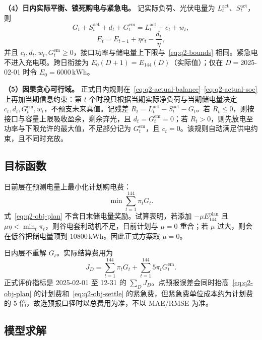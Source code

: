 \noindent\textbf{（4）日内实际平衡、锁死购电与紧急电。}
记实际负荷、光伏电量为 \(L_t^{\mathrm{act}}\)、\(S_t^{\mathrm{act}}\)，则
\begin{equation}
\label{eq:q2-actual-balance}
G_t+S_t^{\mathrm{act}}+d_t+G_t^{\mathrm{em}}
=L_t^{\mathrm{act}}+c_t+w_t,
\end{equation}
\begin{equation}
\label{eq:q2-actual-soc}
E_t=E_{t-1}+\eta c_t-\frac{d_t}{\eta},
\end{equation}
并且 \(c_t,d_t,w_t,G_t^{\mathrm{em}}\ge 0\)，接口功率与储电量上下限与~\eqref{eq:q2-bounds} 相同。紧急电不进入充电项。跨日衔接为 \(E_0(D+1)=E_{144}(D)\)（实际值）；仅在 \(D=\)2025-02-01 时令 \(E_0=6000\,\mathrm{kWh}\)。

\noindent\textbf{（5）因果贪心可行域。}
正式日内规则在~\eqref{eq:q2-actual-balance}--\eqref{eq:q2-actual-soc} 上再加当期信息约束：第 \(t\) 个时段只根据当期实际净负荷与当期储电量决定 \(c_t,d_t,G_t^{\mathrm{em}},w_t\)，不预支未来真值。记残差 \(R_t=L_t^{\mathrm{act}}-S_t^{\mathrm{act}}-G_t\)。若 \(R_t\le 0\)，则按接口与容量上限吸收盈余，剩余弃光，且 \(d_t=G_t^{\mathrm{em}}=0\)；若 \(R_t>0\)，则先放电至功率与下限允许的最大值，不足部分记为 \(G_t^{\mathrm{em}}\)，且 \(c_t=0\)。该规则自动满足供电约束，且不同时充放。

\subsection{目标函数}

日前层在预测电量上最小化计划购电费：
\begin{equation}
\label{eq:q2-obj-plan}
\min\sum_{t=1}^{144}\pi_t G_t.
\end{equation}
式~\eqref{eq:q2-obj-plan} 不含日末储电量奖励。试算表明，若添加 \(-\mu E_{144}^{\mathrm{plan}}\) 且 \(\mu\eta<\min_t\pi_t\)，则谷电套利动机不足，日前计划与 \(\mu=0\) 重合；若 \(\mu\) 过大，则会在低谷把储电量顶到 \(10800\,\mathrm{kWh}\)。因此正式方案取 \(\mu=0\)。

日内层不重解 \(G_t\)。实际结算费用为
\begin{equation}
\label{eq:q2-obj-settle}
J_D=\sum_{t=1}^{144}\pi_t G_t+\sum_{t=1}^{144}5\pi_t G_t^{\mathrm{em}}.
\end{equation}
正式评价指标是 2025-02-01 至 12-31 的 \(\sum_D J_D\)。点预报误差会同时抬高~\eqref{eq:q2-obj-plan} 的计划费和~\eqref{eq:q2-obj-settle} 的紧急费，但紧急费单位成本约为计划费的 5 倍，故选预报口径时以总费用为准，不以 MAE/RMSE 为准。

\subsection{模型求解}


